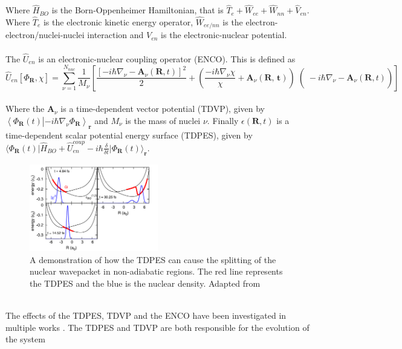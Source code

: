 Where $\hat{H}_{BO}$ is the Born-Oppenheimer Hamiltonian, that is $\hat{T}_{e} + \hat{W}_{ee} + \hat{W}_{nn} + \hat{V}_{en}$. Where $\hat{T}_{e}$ is the electronic kinetic energy operator, $\hat{W}_{ee/nn}$ is the electron-electron/nuclei-nuclei interaction and $V_{en}$ is the electronic-nuclear potential.
\\\\
The $\hat{U}_{en}$ is an electronic-nuclear coupling operator (ENCO). This is defined as \begin{equation}
  \hat{U}_{en}[\Phi_{\textbf{R}}, \chi] = \sum_{\nu=1}^{N_{nuc}} \frac{1}{M_{\nu}} \left[ \frac{\left[-i \hbar \nabla_{\nu} - \textbf{A}_{\nu}(\textbf{R}, t) \right]^2}{2} + \left( \left. \left. \frac{-i\hbar \nabla_{\nu} \chi}{\chi} + \textbf{A}_{\nu}(\textbf{R, t})\right)\right( -i\hbar\nabla_{\nu} - \textbf{A}_{\nu}(\textbf{R}, t)\right) \right]
  \label{eq:ENCO}
\end{equation}
\\
Where the $\textbf{A}_{\nu}$ is a time-dependent vector potential (TDVP), given by $\left\langle \Phi_{\textbf{R}}(t) \right\vert \left. - i \hbar \nabla_{\nu} \Phi_{\textbf{R}} \right\rangle_{\textbf{r}}$ and $M_{\nu}$ is the mass of nuclei $\nu$.
Finally $\epsilon(\textbf{R}, t)$ is a time-dependent scalar potential energy surface (TDPES), given by $\langle \Phi_{\textbf{R}}(t) \vert \hat{H}_{BO} + \hat{U}_{en}^{coup} - i\hbar \frac{\delta}{\delta t} \vert \Phi_{\textbf{R}}(t) \rangle_{\textbf{r}}$.
\\
\begin{figure}
  \includegraphics[width=0.5\textwidth]{./img/nuclear_splitting_TDPES.png}
  \caption{A demonstration of how the TDPES can cause the splitting of the nuclear wavepacket in non-adiabatic regions. The red line represents the TDPES and the blue is the nuclear density. Adapted from \cite{agostini_exact_2015} \label{fig:step_TDPES}}
\end{figure}
\\
The effects of the TDPES, TDVP and the ENCO have been investigated in multiple works \cite{agostini_semiclassical_2015, agostini_exact_2015, agostini_mixed_2013, abedi_dynamical_2013, Min2014Dec}. The TDPES and TDVP are both responsible for the evolution of the system
